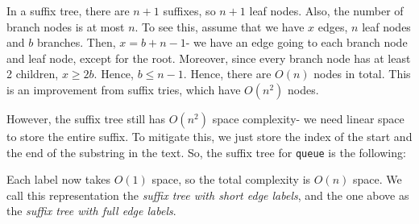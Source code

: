 \documentclass[a4paper, openany]{memoir}
\begin{document}
    In a suffix tree, there are $n+1$ suffixes, so $n+1$ leaf nodes. Also, the number of branch nodes is at most $n$. To see this, assume that we have $x$ edges, $n$ leaf nodes and $b$ branches. Then, $x = b + n - 1$- we have an edge going to each branch node and leaf node, except for the root. Moreover, since every branch node has at least 2 children, $x \geq 2b$. Hence, $b \leq n - 1$. Hence, there are $O(n)$ nodes in total. This is an improvement from suffix tries, which have $O(n^2)$ nodes.
    
    However, the suffix tree still has $O(n^2)$ space complexity- we need linear space to store the entire suffix. To mitigate this, we just store the index of the start and the end of the substring in the text. So, the suffix tree for \texttt{queue} is the following:    
    \begin{figure}[H]
        \centering
    \end{figure}
    \noindent Each label now takes $O(1)$ space, so the total complexity is $O(n)$ space. We call this representation the \emph{suffix tree with short edge labels}, and the one above as the \emph{suffix tree with full edge labels}.
\end{document}
